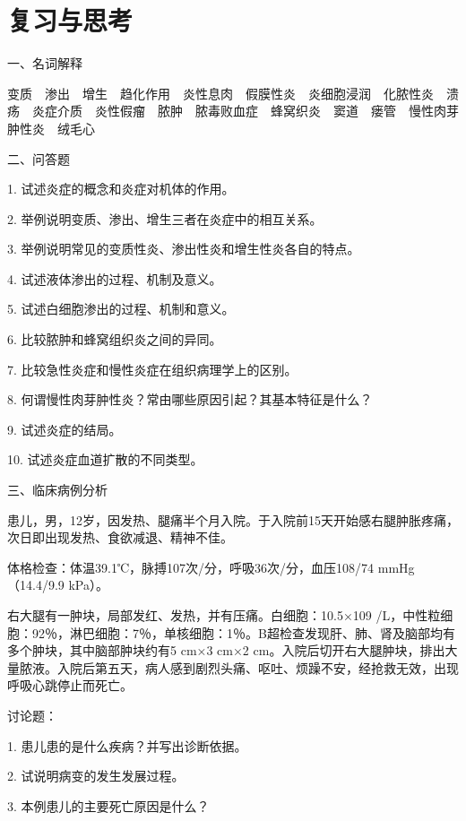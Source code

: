 \section*{复习与思考}

{一、名词解释}

变质　渗出　增生　趋化作用　炎性息肉　假膜性炎　炎细胞浸润　化脓性炎　溃疡　炎症介质　炎性假瘤　脓肿　脓毒败血症　蜂窝织炎　窦道　瘘管　慢性肉芽肿性炎　绒毛心

{二、问答题}

1. 试述炎症的概念和炎症对机体的作用。

2. 举例说明变质、渗出、增生三者在炎症中的相互关系。

3. 举例说明常见的变质性炎、渗出性炎和增生性炎各自的特点。

4. 试述液体渗出的过程、机制及意义。

5. 试述白细胞渗出的过程、机制和意义。

6. 比较脓肿和蜂窝组织炎之间的异同。

7. 比较急性炎症和慢性炎症在组织病理学上的区别。

8. 何谓慢性肉芽肿性炎？常由哪些原因引起？其基本特征是什么？

9. 试述炎症的结局。

10. 试述炎症血道扩散的不同类型。

{三、临床病例分析}

患儿，男，12岁，因发热、腿痛半个月入院。于入院前15天开始感右腿肿胀疼痛，次日即出现发热、食欲减退、精神不佳。

体格检查：体温39.1℃，脉搏107次/分，呼吸36次/分，血压108/74
mmHg（14.4/9.9 kPa）。

右大腿有一肿块，局部发红、发热，并有压痛。白细胞：10.5×10{9}
/L，中性粒细胞：92％，淋巴细胞：7％，单核细胞：1％。B超检查发现肝、肺、肾及脑部均有多个肿块，其中脑部肿块约有5
cm×3 cm×2
cm。入院后切开右大腿肿块，排出大量脓液。入院后第五天，病人感到剧烈头痛、呕吐、烦躁不安，经抢救无效，出现呼吸心跳停止而死亡。

讨论题：

1. 患儿患的是什么疾病？并写出诊断依据。

2. 试说明病变的发生发展过程。

3. 本例患儿的主要死亡原因是什么？




